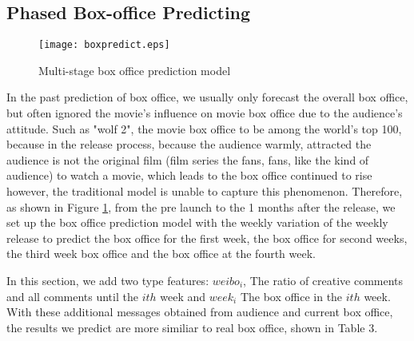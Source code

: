 \subsection{Phased Box-office Predicting}
\begin{figure}[!htbp]
\centering
\texttt{[image: boxpredict.eps]}
\caption{Multi-stage box office prediction model}
\label{fig:dyna}
\end{figure}
In the past prediction of box office, we usually only forecast the overall box office, but often ignored the movie's influence on movie box office due to the audience's attitude. Such as "wolf 2", the movie box office to be among the world's top 100, because in the release process, because the audience warmly, attracted the audience is not the original film (film series the fans, fans, like the kind of audience) to watch a movie, which leads to the box office continued to rise however, the traditional model is unable to capture this phenomenon. Therefore, as shown in Figure \ref{fig:dyna}, from the pre launch to the 1 months after the release, we set up the box office prediction model with the weekly variation of the weekly release to predict the box office for the first week, the box office for second weeks, the third week box office and the box office at the fourth week.
\par In this section, we add two type features: $weibo_i$, The ratio of creative comments and all comments until the $ith$ week
and $week_i$ The box office in the $ith$ week. With these additional messages obtained from audience and current box office, the results we predict are more similiar to real box office, shown in Table 3.
